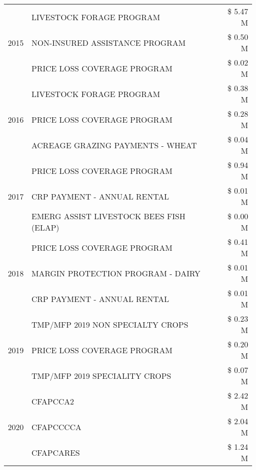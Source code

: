 \begin{tabular}{llr}
\cline{1-3}
\multirow[t]{3}{*}{2015} & LIVESTOCK FORAGE PROGRAM & \$ 5.47 M \\
 & NON-INSURED ASSISTANCE PROGRAM & \$ 0.50 M \\
 & PRICE LOSS COVERAGE PROGRAM & \$ 0.02 M \\
\cline{1-3}
\multirow[t]{3}{*}{2016} & LIVESTOCK FORAGE PROGRAM & \$ 0.38 M \\
 & PRICE LOSS COVERAGE PROGRAM & \$ 0.28 M \\
 & ACREAGE GRAZING PAYMENTS - WHEAT & \$ 0.04 M \\
\cline{1-3}
\multirow[t]{3}{*}{2017} & PRICE LOSS COVERAGE PROGRAM & \$ 0.94 M \\
 & CRP PAYMENT - ANNUAL RENTAL & \$ 0.01 M \\
 & EMERG ASSIST LIVESTOCK BEES FISH (ELAP) & \$ 0.00 M \\
\cline{1-3}
\multirow[t]{3}{*}{2018} & PRICE LOSS COVERAGE PROGRAM & \$ 0.41 M \\
 & MARGIN PROTECTION PROGRAM - DAIRY & \$ 0.01 M \\
 & CRP PAYMENT - ANNUAL RENTAL & \$ 0.01 M \\
\cline{1-3}
\multirow[t]{3}{*}{2019} & TMP/MFP 2019 NON SPECIALTY CROPS & \$ 0.23 M \\
 & PRICE LOSS COVERAGE PROGRAM & \$ 0.20 M \\
 & TMP/MFP 2019 SPECIALITY CROPS & \$ 0.07 M \\
\cline{1-3}
\multirow[t]{3}{*}{2020} & CFAPCCA2 & \$ 2.42 M \\
 & CFAPCCCCA & \$ 2.04 M \\
 & CFAPCARES & \$ 1.24 M \\
\cline{1-3}
\bottomrule
\end{tabular}
